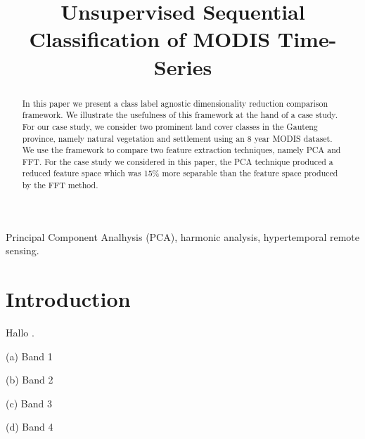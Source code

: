 \documentclass{article}
\title{Unsupervised Sequential Classification of MODIS Time-Series}
\begin{document}
%
\maketitle
%
\begin{abstract}
In this paper we present a class label agnostic dimensionality reduction comparison framework. 
We illustrate the usefulness of this framework at the hand of a case study. For our case study, we consider two prominent land cover classes in the Gauteng province, namely natural vegetation and settlement using an 8 year MODIS dataset. We use the framework to compare two 
feature extraction techniques, namely PCA and FFT. For the case study we considered in this paper, the PCA technique produced a reduced feature space which was 15\% more 
separable than the feature space produced by the FFT method.
\end{abstract}
%
\begin{keywords}
Principal Component Analhysis (PCA), harmonic analysis, hypertemporal remote sensing.
\end{keywords}
%

\section{Introduction}
\label{sec:intro}
Hallo \cite{almeida2015}.

\begin{minipage}[b]{.47\linewidth}
  \centering 
  \centerline{}
  \centerline{(a) Band 1}\medskip
\end{minipage}
\hfill
\begin{minipage}[b]{0.47\linewidth}
  \centering
  \centerline{}
  \centerline{(b) Band 2}\medskip
\end{minipage}

\begin{minipage}[b]{.47\linewidth}
  \centering 
  \centerline{}
  \centerline{(c) Band 3}\medskip
\end{minipage}
\hfill
\begin{minipage}[b]{0.47\linewidth}
  \centering
  \centerline{}
  \centerline{(d) Band 4}\medskip
\end{minipage}
\end{document}
